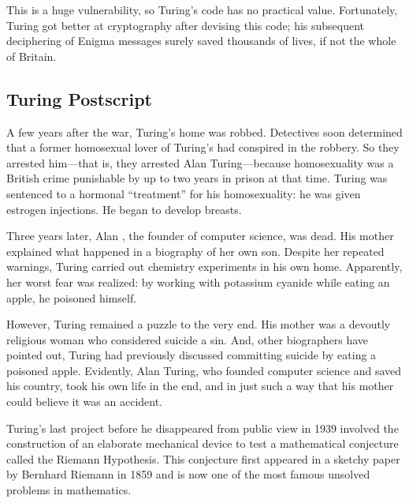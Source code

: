 This is a huge vulnerability, so Turing's code has no practical value.
Fortunately, Turing got better at cryptography after devising this
code; his subsequent deciphering of Enigma messages surely saved
thousands of lives, if not the whole of Britain.


\subsection{Turing Postscript}

A few years after the war, Turing's home was robbed.  Detectives soon
determined that a former homosexual lover of Turing's had conspired in
the robbery.  So they arrested him---that is, they arrested Alan
Turing---because homosexuality was a British crime punishable by up
to two years in prison at that time.  Turing was sentenced to a
hormonal ``treatment'' for his homosexuality: he was given estrogen
injections.  He began to develop breasts.

Three years later, Alan , the founder of computer science, was
dead.  His mother explained what happened in a biography of her own
son.  Despite her repeated warnings, Turing carried out chemistry
experiments in his own home.  Apparently, her worst fear was realized:
by working with potassium cyanide while eating an apple, he poisoned
himself.

However, Turing remained a puzzle to the very end.  His mother was a
devoutly religious woman who considered suicide a sin.  And, other
biographers have pointed out, Turing had previously discussed
committing suicide by eating a poisoned apple.  Evidently, Alan
Turing, who founded computer science and saved his country, took his
own life in the end, and in just such a way that his mother could
believe it was an accident.

Turing's last project before he disappeared from public view in 1939
involved the construction of an elaborate mechanical device to test a
mathematical conjecture called the Riemann Hypothesis.  This conjecture
first appeared in a sketchy paper by Bernhard Riemann in 1859 and is now
one of the most famous unsolved problems in mathematics.

